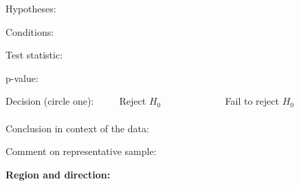 \documentclass[12pt]{article}
\newcommand{\soln}[2]{$\:$\\ \vspace{#1}}{}
\begin{document}
Hypotheses:
\soln{1.5cm}{$H_0$: The sample distribution of regions follows the census distribution. \\
$H_A$: The sample distribution of regions does not follow the census distribution.}

Conditions:
\soln{4cm}{}

Test statistic:
\soln{3cm}{
$\chi^2 = \frac{(83 - 90)^2}{90} + \frac{(121 - 110)^2}{110} + \frac{(193 - 185)^2}{185} + \frac{(103 - 115)^2}{115} \approx 3.24$ \\
$df = 4 - 1 = 3$}

p-value:
\soln{1cm}{$p-value > 0.3$}

Decision (circle one):  $\qquad$ Reject $H_0$ $\qquad \qquad \qquad$ Fail to reject $H_0$ \\
$\:$ \\

Conclusion in context of the data:
\soln{2cm}{The data do not provide convincing evidence that the sample distribution of regions does not follow the 
census distribution.}

Comment on representative sample:
\soln{2cm}{The sample is likely representative since the distribution of sampled individual matches the distribution 
regional population distribution.}

%
\pagebreak

\textbf{Region and direction:} 
\end{document}
